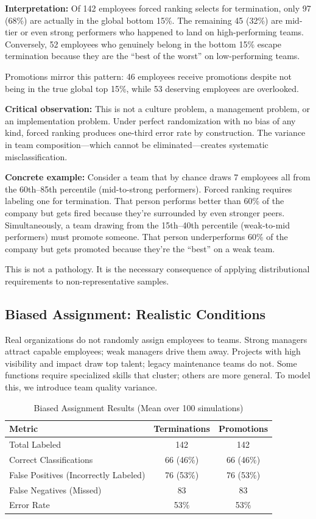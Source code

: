 \documentclass[12pt]{article}
\begin{document}
\textbf{Interpretation:} Of 142 employees forced ranking selects for termination, only 97 (68\%) are actually in the global bottom 15\%. The remaining 45 (32\%) are mid-tier or even strong performers who happened to land on high-performing teams. Conversely, 52 employees who genuinely belong in the bottom 15\% escape termination because they are the ``best of the worst'' on low-performing teams.

Promotions mirror this pattern: 46 employees receive promotions despite not being in the true global top 15\%, while 53 deserving employees are overlooked.

\textbf{Critical observation:} This is not a culture problem, a management problem, or an implementation problem. Under perfect randomization with no bias of any kind, forced ranking produces one-third error rate by construction. The variance in team composition---which cannot be eliminated---creates systematic misclassification.

\textbf{Concrete example:} Consider a team that by chance draws 7 employees all from the 60th--85th percentile (mid-to-strong performers). Forced ranking requires labeling one for termination. That person performs better than 60\% of the company but gets fired because they're surrounded by even stronger peers. Simultaneously, a team drawing from the 15th--40th percentile (weak-to-mid performers) must promote someone. That person underperforms 60\% of the company but gets promoted because they're the ``best'' on a weak team.

This is not a pathology. It is the necessary consequence of applying distributional requirements to non-representative samples.

\subsection{Biased Assignment: Realistic Conditions}

Real organizations do not randomly assign employees to teams. Strong managers attract capable employees; weak managers drive them away. Projects with high visibility and impact draw top talent; legacy maintenance teams do not. Some functions require specialized skills that cluster; others are more general. To model this, we introduce team quality variance.

\begin{table}[h]
\centering
\caption{Biased Assignment Results (Mean over 100 simulations)}
\label{tab:biased}
\begin{tabular}{lcc}
\toprule
\textbf{Metric} & \textbf{Terminations} & \textbf{Promotions} \\
\midrule
Total Labeled & 142 & 142 \\
Correct Classifications & 66 (46\%) & 66 (46\%) \\
False Positives (Incorrectly Labeled) & 76 (53\%) & 76 (53\%) \\
False Negatives (Missed) & 83 & 83 \\
Error Rate & 53\% & 53\% \\
\bottomrule
\end{tabular}
\end{table}
\end{document}
